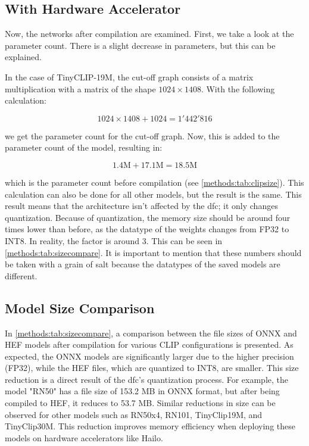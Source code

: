 \subsection{With Hardware Accelerator}

Now, the networks after compilation are examined. First, we take a look at the parameter count.
There is a slight decrease in parameters, but this can be explained.

In the case of TinyCLIP-19M, the cut-off graph consists of a matrix multiplication with a matrix of the shape \(1024 \times 1408\). With the following calculation:

\begin{equation*}
    1024 \times 1408 + 1024 = 1'442'816
\end{equation*}

we get the parameter count for the cut-off graph. Now, this is added to the parameter count of the model, resulting in:

\begin{equation*}
    1.4 \text{M} + 17.1 \text{M} = 18.5 \text{M} 
\end{equation*}

which is the parameter count before compilation (see \cref{methods:tab:clipsize}).
This calculation can also be done for all other models, but the result is the same.
This result means that the architecture isn't affected by the \acrshort{dfc}; it only changes quantization.
Because of quantization, the memory size should be around four times lower than before, as the datatype of the weights changes from FP32 to INT8.
In reality, the factor is around 3.
This can be seen in \cref{methods:tab:sizecompare}.
It is important to mention that these numbers should be taken with a grain of salt because the datatypes of the saved models are different.


\subsection{Model Size Comparison}

In \cref{methods:tab:sizecompare}, a comparison between the file sizes of ONNX and HEF models after compilation for various CLIP configurations is presented.
As expected, the ONNX models are significantly larger due to the higher precision (FP32), while the HEF files, which are quantized to INT8, are smaller.
This size reduction is a direct result of the \acrshort{dfc}'s quantization process.
For example, the model "RN50" has a file size of 153.2 MB in ONNX format, but after being compiled to HEF, it reduces to 53.7 MB.
Similar reductions in size can be observed for other models such as RN50x4, RN101, TinyClip19M, and TinyClip30M.
This reduction improves memory efficiency when deploying these models on hardware accelerators like Hailo.


